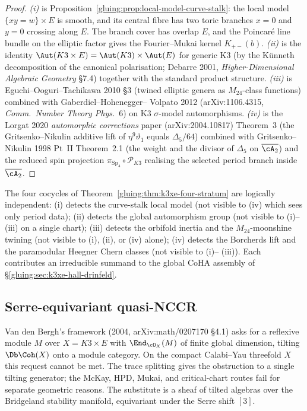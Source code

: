 \begin{proof}
\emph{(i)} is Proposition~\ref{gluing:prop:local-model-curve-stalk}: the local
model $\{xy = w\} \times E$ is smooth, and its central fibre has two
toric branches \(x=0\) and \(y=0\) crossing along \(E\). The branch
cover has overlap \(E\), and the Poincar\'e line bundle on the elliptic
factor gives the Fourier--Mukai kernel \(K_{+-}(b)\). \emph{(ii)} is
the identity $\Aut(K3 \times E) =
\Aut(K3) \times \Aut(E)$ for generic K3 (by the K\"unneth decomposition
of the canonical polarisation; Debarre 2001, \emph{Higher-Dimensional
Algebraic Geometry} \S 7.4) together with the standard product structure.
\emph{(iii)} is Eguchi--Ooguri--Tachikawa 2010 \S 3 (twined elliptic
genera as $M_{24}$-class functions) combined with Gaberdiel--Hohenegger--
Volpato 2012 (arXiv:1106.4315, \emph{Comm.\ Number Theory Phys.}~6)
on K3 $\sigma$-model automorphisms. \emph{(iv)} is the Lorgat 2020
\emph{automorphic corrections} paper (arXiv:2004.10817) Theorem~3
(the Gritsenko--Nikulin additive lift of $\eta^9 \vartheta_1$ equals
$\Delta_5 / 64$) combined with Gritsenko--Nikulin 1998 Pt~II
Theorem~2.1 (the weight and the divisor of $\Delta_5$ on
$\overline{\cA_2}$) and the reduced spin projection
\(\pi_{\mathrm{Sp}_4}\circ\mathscr P_{K3}\) realising the selected
period branch inside $\overline{\cA_2}$.
\end{proof}

\begin{remark}
\label{gluing:rem:cocycle-non-redundancy}
The four cocycles of Theorem~\ref{gluing:thm:k3xe-four-stratum} are
logically independent: (i) detects the curve-stalk local model (not
visible to (iv) which sees only period data); (ii) detects the global
automorphism group (not visible to (i)--(iii) on a single chart);
(iii) detects the orbifold inertia and the $M_{24}$-moonshine twining
(not visible to (i), (ii), or (iv) alone); (iv) detects the Borcherds
lift and the paramodular Heegner Chern classes (not visible to (i)--
(iii)). Each contributes an irreducible summand to the global CoHA
assembly of \S\ref{gluing:sec:k3xe-hall-drinfeld}.
\end{remark}

\subsection{Serre-equivariant quasi-NCCR}
\label{gluing:sec:k3xe-quasi-nccr}

Van den Bergh's framework (2004, arXiv:math/0207170 \S 4.1) asks for
a reflexive module $M$ over $X = K3 \times E$ with $\End_{\cO_X}(M)$
of finite global dimension, tilting $\Db\Coh(X)$ onto a module
category. On the compact Calabi--Yau threefold $X$ this request
cannot be met. The trace splitting gives the obstruction to a single
tilting generator; the McKay, HPD, Mukai, and critical-chart routes
fail for separate geometric reasons. The substitute is a sheaf of
tilted algebras over the Bridgeland stability manifold, equivariant
under the Serre shift $[3]$.

